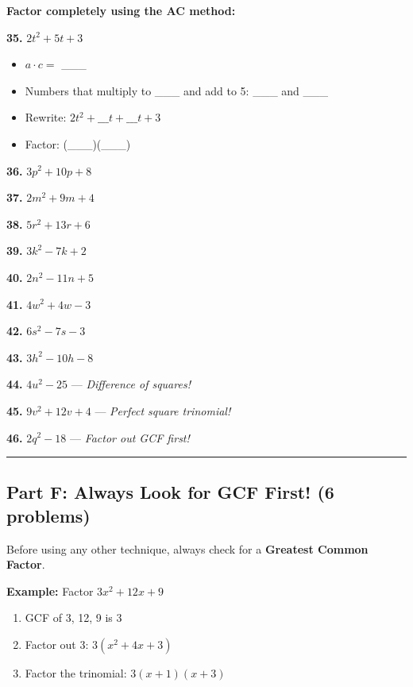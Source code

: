 \documentclass[
  11pt,
]{article}
\providecommand{\tightlist}{%
  \setlength{\itemsep}{0pt}\setlength{\parskip}{0pt}}
\begin{document}
\textbf{Factor completely using the AC method:}

\textbf{35.} \(2t^2 + 5t + 3\)

\begin{itemize}
\tightlist
\item
  \(a \cdot c ={}\) \_\_\_
\item
  Numbers that multiply to \_\_\_ and add to 5: \_\_\_ and \_\_\_
\item
  Rewrite: \(2t^2 + \_\_\_t + \_\_\_t + 3\)
\item
  Factor: (\_\_\_)(\_\_\_)
\end{itemize}

\textbf{36.} \(3p^2 + 10p + 8\)

\textbf{37.} \(2m^2 + 9m + 4\)

\textbf{38.} \(5r^2 + 13r + 6\)

\textbf{39.} \(3k^2 - 7k + 2\)

\textbf{40.} \(2n^2 - 11n + 5\)

\textbf{41.} \(4w^2 + 4w - 3\)

\textbf{42.} \(6s^2 - 7s - 3\)

\textbf{43.} \(3h^2 - 10h - 8\)

\textbf{44.} \(4u^2 - 25\) --- \emph{Difference of squares!}

\textbf{45.} \(9v^2 + 12v + 4\) --- \emph{Perfect square trinomial!}

\textbf{46.} \(2q^2 - 18\) --- \emph{Factor out GCF first!}

\begin{center}\rule{0.5\linewidth}{0.5pt}\end{center}

\hypertarget{part-f-always-look-for-gcf-first-6-problems}{%
\subsection{Part F: Always Look for GCF First! (6
problems)}\label{part-f-always-look-for-gcf-first-6-problems}}

Before using any other technique, always check for a \textbf{Greatest
Common Factor}.

\textbf{Example:} Factor \(3x^2 + 12x + 9\)

\begin{enumerate}
\def\labelenumi{\arabic{enumi}.}
\tightlist
\item
  GCF of 3, 12, 9 is 3
\item
  Factor out 3: \(3(x^2 + 4x + 3)\)
\item
  Factor the trinomial: \(3(x + 1)(x + 3)\)
\end{enumerate}
\end{document}
